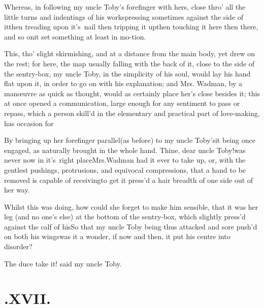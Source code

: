 \documentclass{article}
\begin{document}
Whereas, in following my uncle Toby’s forefinger
with hers, close thro’ all the little turns and indentings of
his works\tsh pressing sometimes against the side of
it\tsh then treading upon it's\sic\ nail \tsh then
tripping it up\tsh then touching it here \tsh then
there, and so on\tsh it set something at least in
mo-\break tion.

This, tho’ slight skirmishing, and at a distance from the
main body, yet drew on the rest; for here, the map usually falling
with the back of it, close to the side of the sentry-box, my uncle
Toby, in the simplicity of his soul, would lay his hand flat
upon it, in order to go on with his explanation; and Mrs.\@
Wadman, by a manœuvre as quick as thought, would as
certainly place her’s close besides it; this at once opened a
communication, large enough for any sentiment to pass or repass,
which a person skill’d in the elementary and practical part of love-making, has
occasion for\tsh

By bringing up her forefinger parallel\break (as before) to my uncle Toby’s\tsk it
being once engaged, as naturally brought in the whole hand. Thine, dear uncle
Toby!\@ was never now in it’s\sic\ right place\break\tsh Mrs.\@ Wadman had it ever to
take up, or, with the gentlest pushings, protrusions, and equivocal compressions,
that a hand to be removed is capable of receiving\tsh to get it press’d a hair
breadth of one side out of her way.

Whilst this was doing, how could she forget to make him
sensible, that it was her leg (and no one’s else) at the
bottom of the sentry-box, which slightly press’d against the
calf of his\tsh So that my uncle Toby being thus
attacked and sore push’d on both his
wings\tsh was it a wonder, if now and then, it put his\break
centre into disorder?\tsh

\tsh The duce take it! said my uncle Toby.

\vfill{}\eject\null\smallskip
\section{.\enspace XVII.}
\end{document}
